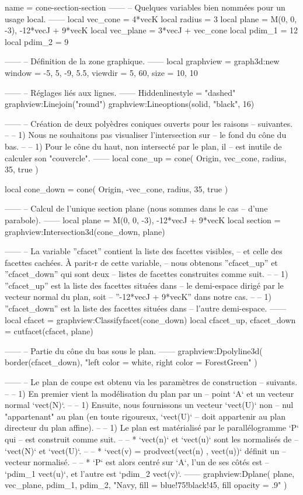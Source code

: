 \documentclass[border = 3pt]{standalone}
\begin{document}
\begin{luadraw}{name = cone-section-section}
------
-- Quelques variables bien nommées pour un usage local.
------
local vec_cone  = 4*vecK
local radius  = 3
local plane   = {M(0, 0, -3), -12*vecJ + 9*vecK}
local vec_plane = 3*vecJ + vec_cone
local pdim_1  = 12
local pdim_2  = 9

------
-- Définition de la zone graphique.
------
local graphview = graph3d:new{
  window  = {-5, 5, -9, 5.5},
  viewdir = {5, 60},
  size  = {10, 10}
}

------
-- Réglages liés aux lignes.
------
Hiddenlinestyle = "dashed"
graphview:Linejoin("round")
graphview:Lineoptions(solid, "black", 16)

------
-- Création de deux polyèdres coniques ouverts pour les raisons
-- suivantes.
--
--     1) Nous ne souhaitons pas visualiser l'intersection sur
--     le fond du cône du bas.
--
--     1) Pour le cône du haut, non intersecté par le plan, il
--     est inutile de calculer son "couvercle".
------
local cone_up = cone(
  Origin, vec_cone, radius,
  35,
  true
)

local cone_down = cone(
  Origin, -vec_cone, radius,
  35,
  true
)

------
-- Calcul de l'unique section plane (nous sommes dans le cas
-- d'une parabole).
------
local plane   = {M(0, 0, -3), -12*vecJ + 9*vecK}
local section = graphview:Intersection3d(cone_down, plane)

------
-- La variable ''cfacet'' contient la liste des facettes visibles,
-- et celle des facettes cachées. À parit-r de cette variable,
-- nous obtenons ''cfacet_up'' et ''cfacet_down'' qui sont deux
-- listes de facettes construites comme suit.
--
--   1) ''cfacet_up'' est la liste des facettes situées dans
--   le demi-espace dirigé par le vecteur normal du plan, soit
--   ''-12*vecJ + 9*vecK'' dans notre cas.
--
--   1) ''cfacet_down'' est la liste des facettes situées dans
--   l’autre demi-espace.
------
local cfacet         = graphview:Classifyfacet(cone_down)
local cfacet_up, cfacet_down = cutfacet(cfacet, plane)

------
-- Partie du cône du bas sous le plan.
------
graphview:Dpolyline3d(
  border(cfacet_down),
  "left color = white, right color = ForestGreen"
)

------
-- Le plan de coupe est obtenu via les paramètres de construction
-- suivants.
--
--     1) En premier vient la modélisation du plan par un
--     point `A` et un vecteur normal `vect(N)`.
--
--     1) Ensuite, nous fournissons un vecteur `vect(U)` non
--     nul "appartenant" au plan (en toute rigoureux, `vect(U)`
--     doit appartenir au plan directeur du plan affine).
--
--     1) Le plan est matérialisé par le parallélogramme `P` qui
--     est construit comme suit.
--
--         * `vect(n)` et `vect(u)` sont les normalisés de
--         `vect(N)` et `vect(U)`.
--
--         * `vect(v) = prodvect(vect(n) , vect(u))` définit un
--         vecteur normalisé.
--
--         * `P` est alors centré sur `A`, l'un de ses côtés est
--         `pdim_1 vect(u)`, et l'autre est `pdim_2 vect(v)`.
------
graphview:Dplane(
  plane,
  vec_plane, pdim_1, pdim_2,
  "Navy, fill = blue!75!black!45, fill opacity = .9"
)


\end{luadraw}
\end{document}
